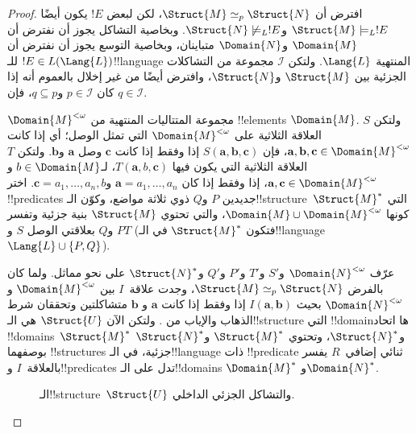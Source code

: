 \documentclass[../../../include/open-logic-section]{subfiles}
\begin{document}
\begin{proof}
افترض أن $\Struct{M} \simeq_p \Struct{N}$، لكن لبعض $!E$ يكون أيضًا
$\Struct{M} \models_L !E$ و$\Struct{N} \not\models_L !E$. وبخاصية
التشاكل يجوز أن نفترض أن $\Domain{M}$ و$\Domain{N}$ متباينان، وبخاصية
التوسع يجوز أن نفترض أن $!E \in L(\Lang{L})$ للـ!!{language} المنتهية
$\Lang{L}$. ولتكن $\mathcal{I}$ مجموعة من التشاكلات الجزئية بين
$\Struct{M}$ و$\Struct{N}$، وافترض أيضًا من غير إخلال بالعموم أنه إذا
كان $p \in \mathcal{I}$ و$q \subseteq p$، فإن $q \in \mathcal{I}$.

$\Domain{M}^{<\omega}$ مجموعة المتتاليات المنتهية من !!{element}s
$\Domain{M}$. ولتكن $S$ العلاقة الثلاثية على $\Domain{M}^{<\omega}$
التي تمثل الوصل؛ أي إذا كانت
$\mathbf{a},\mathbf{b},\mathbf{c} \in \Domain{M}^{<\omega}$، فإن
$S(\mathbf{a},\mathbf{b},\mathbf{c})$ إذا وفقط إذا كانت $\mathbf{c}$
وصل $\mathbf{a}$ و$\mathbf{b}$. ولتكن $T$ العلاقة الثلاثية التي يكون
فيها $T(\mathbf{a},b,\mathbf{c})$، لـ$b \in \Domain{M}$ و
$\mathbf{a},\mathbf{c} \in \Domain{M}^{<\omega}$، إذا وفقط إذا كان
$\mathbf{a}=a_1,\dots,a_n$ و$\mathbf{c}=a_1,\dots,a_n,b$. اختر
!!{predicate}s جديدين $P$ و$Q$ ذوي ثلاثة مواضع، وكوّن
الـ!!{structure}~$\Struct{M}^*$ التي كونها
$\Domain{M} \cup \Domain{M}^{<\omega}$، والتي تحتوي $\Struct{M}$
بنية جزئية وتفسر $P$ و$Q$ بعلاقتي الوصل $S$ و$T$ (فتكون
$\Struct{M}^*$ في الـ!!{language}~$\Lang{L} \cup \{P,Q\}$).

عرّف $\Domain{N}^{<\omega}$ و$S'$ و$T'$ و$P'$ و$Q'$ و$\Struct{N}^*$
على نحو مماثل. ولما كان بالفرض $\Struct{M} \simeq_p \Struct{N}$، وجدت
علاقة~$I$ بين $\Domain{M}^{<\omega}$ و$\Domain{N}^{<\omega}$ بحيث
$I(\mathbf{a},\mathbf{b})$ إذا وفقط إذا كانت $\mathbf{a}$ و
$\mathbf{b}$ متشاكلتين وتحققان شرط الذهاب والإياب من
. ولتكن الآن $\Struct{U}$ هي
الـ!!{structure} التي !!{domain}ها اتحاد !!{domain}s~$\Struct{M}^*$
و$\Struct{N}^*$، وتحتوي $\Struct{M}^*$ و$\Struct{N}^*$ بوصفهما
!!{structure}s جزئية، في الـ!!{language} ذات !!{predicate} ثنائي
إضافي~$R$ يفسر بالعلاقة~$I$ و!!{predicate}s تدل على الـ!!{domain}s
$\Domain{M}^*$ و$\Domain{N}^*$.

\begin{figure}[h]
  \centering
  \caption{الـ!!{structure}~$\Struct{U}$ والتشاكل الجزئي الداخلي.}
\end{figure}


\end{proof}
\end{document}
